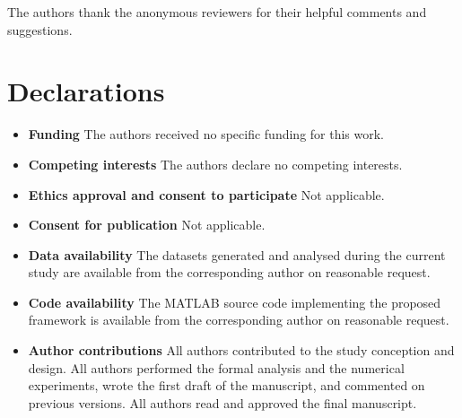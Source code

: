 \documentclass[pdflatex,sn-basic,Numbered]{sn-jnl}
\begin{document}
The authors thank the anonymous reviewers for their helpful comments and suggestions.

\section*{Declarations}

\begin{itemize}
\item \textbf{Funding} The authors received no specific funding for this work.

\item \textbf{Competing interests} The authors declare no competing interests.

\item \textbf{Ethics approval and consent to participate} Not applicable.

\item \textbf{Consent for publication} Not applicable.

\item \textbf{Data availability} The datasets generated and analysed during the current study are
available from the corresponding author on reasonable request.

\item \textbf{Code availability} The MATLAB source code implementing the proposed framework is
available from the corresponding author on reasonable request.

\item \textbf{Author contributions} All authors contributed to the study conception and design.
All authors performed the formal analysis and the numerical experiments, wrote the first draft of
the manuscript, and commented on previous versions. All authors read and approved the final
manuscript.
\end{itemize}


\end{document}
